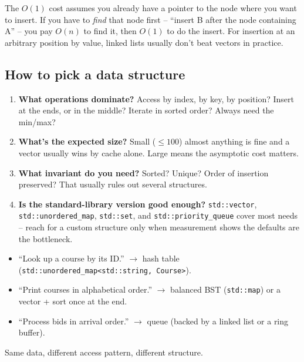 \documentclass[11pt]{article}
\begin{document}
\begin{warnbox}
The $O(1)$ cost assumes you already have a pointer to the node where
you want to insert. If you have to \emph{find} that node first --
``insert B after the node containing A'' -- you pay $O(n)$ to find
it, then $O(1)$ to do the insert. For insertion at an arbitrary
position by value, linked lists usually don't beat vectors in
practice.
\end{warnbox}

\subsection{How to pick a data structure}

\begin{ideabox}
\begin{enumerate}[leftmargin=*,noitemsep]
    \item \textbf{What operations dominate?} Access by index, by key,
          by position? Insert at the ends, or in the middle? Iterate
          in sorted order? Always need the min/max?
    \item \textbf{What's the expected size?} Small ($\le 100$) almost
          anything is fine and a vector usually wins by cache alone.
          Large means the asymptotic cost matters.
    \item \textbf{What invariant do you need?} Sorted? Unique? Order
          of insertion preserved? That usually rules out several
          structures.
    \item \textbf{Is the standard-library version good enough?}
          \texttt{std::vector}, \texttt{std::unordered\_map},
          \texttt{std::set}, and \texttt{std::priority\_queue} cover
          most needs -- reach for a custom structure only when
          measurement shows the defaults are the bottleneck.
\end{enumerate}
\end{ideabox}

\begin{examplebox}
\begin{itemize}[leftmargin=*,noitemsep]
    \item ``Look up a course by its ID.'' $\to$ hash table
          (\texttt{std::unordered\_map<std::string, Course>}).
    \item ``Print courses in alphabetical order.'' $\to$ balanced BST
          (\texttt{std::map}) or a vector + sort once at the end.
    \item ``Process bids in arrival order.'' $\to$ queue (backed by a
          linked list or a ring buffer).
\end{itemize}
Same data, different access pattern, different structure.
\end{examplebox}
\end{document}
